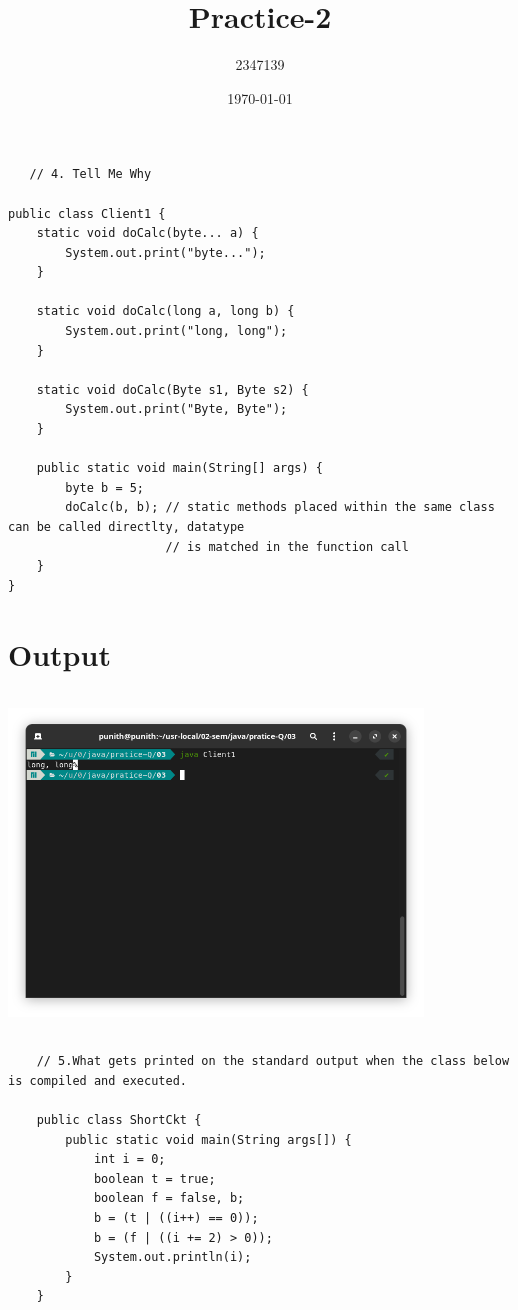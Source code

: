 \documentclass{article}
\title{Practice-2}
\author{2347139}
\date{\today}
\begin{document}
\maketitle
\begin{lstlisting}
   // 4. Tell Me Why

public class Client1 {
    static void doCalc(byte... a) {
        System.out.print("byte...");
    }

    static void doCalc(long a, long b) {
        System.out.print("long, long");
    }

    static void doCalc(Byte s1, Byte s2) {
        System.out.print("Byte, Byte");
    }

    public static void main(String[] args) {
        byte b = 5;
        doCalc(b, b); // static methods placed within the same class can be called directlty, datatype
                      // is matched in the function call
    }
}

\end{lstlisting}

\section*{Output}
\includegraphics[width=11cm, height=9cm]{./images/01.png}
\begin{lstlisting}
    // 5.What gets printed on the standard output when the class below is compiled and executed. 

    public class ShortCkt {
        public static void main(String args[]) {
            int i = 0;
            boolean t = true;
            boolean f = false, b;
            b = (t | ((i++) == 0));
            b = (f | ((i += 2) > 0));
            System.out.println(i);
        }
    }    
 \end{lstlisting}
\end{document}
